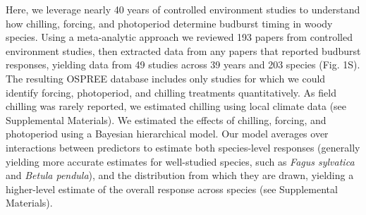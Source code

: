 \documentclass{article}
\begin{document}

\par Here, we leverage nearly 40 years of controlled environment studies to understand how chilling, forcing, and photoperiod determine budburst timing in woody species. Using a meta-analytic approach we reviewed 193 papers from controlled environment studies, then extracted data from any papers that reported budburst responses, yielding data from 49 studies across 39 years and 203 species (Fig. 1S). The resulting OSPREE database includes only studies for which we could identify forcing, photoperiod, and chilling treatments quantitatively. As field chilling was rarely reported, we estimated chilling using local climate data (see Supplemental Materials). We estimated the effects of chilling, forcing, and photoperiod using a Bayesian hierarchical model. Our model averages over interactions between predictors to estimate both species-level responses (generally yielding more accurate estimates for well-studied species, such as \emph{Fagus sylvatica} and \emph{Betula pendula}), and the distribution from which they are drawn, yielding a higher-level estimate of the overall response across species (see Supplemental Materials).
\end{document}
